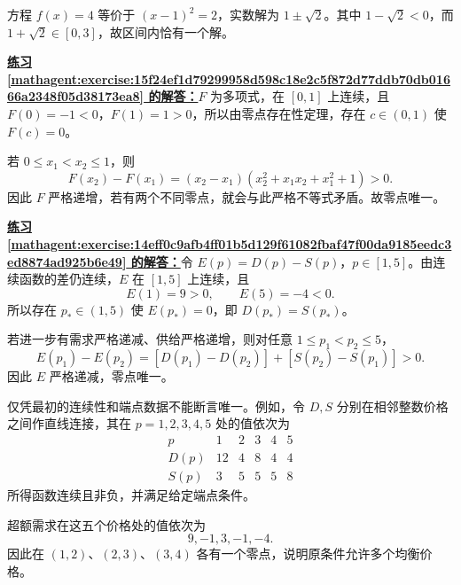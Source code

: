 \documentclass[UTF8,fontset=fandol,11pt]{ctexart}
\begin{document}
方程 $f(x)=4$ 等价于 $(x-1)^2=2$，实数解为 $1\pm\sqrt{2}$。其中 $1-\sqrt{2}<0$，而 $1+\sqrt{2}\in[0,3]$，故区间内恰有一个解。\par
\par\noindent\textbf{\hyperref[mathagent:exercise:15f24ef1d79299958d598c18e2c5f872d77ddb70db01666a2348f05d38173ea8]{练习 \ref*{mathagent:exercise:15f24ef1d79299958d598c18e2c5f872d77ddb70db01666a2348f05d38173ea8} 的解答：}}$F$ 为多项式，在 $[0,1]$ 上连续，且 $F(0)=-1<0$，$F(1)=1>0$，所以由零点存在性定理，存在 $c\in(0,1)$ 使 $F(c)=0$。

若 $0\leq x_1<x_2\leq1$，则
\[
F(x_2)-F(x_1)=(x_2-x_1)(x_2^2+x_1x_2+x_1^2+1)>0.
\]
因此 $F$ 严格递增，若有两个不同零点，就会与此严格不等式矛盾。故零点唯一。\par
\par\noindent\textbf{\hyperref[mathagent:exercise:14eff0c9afb4ff01b5d129f61082fbaf47f00da9185eedc3ed8874ad925b6e49]{练习 \ref*{mathagent:exercise:14eff0c9afb4ff01b5d129f61082fbaf47f00da9185eedc3ed8874ad925b6e49} 的解答：}}令 $E(p)=D(p)-S(p)$，$p\in[1,5]$。由连续函数的差仍连续，$E$ 在 $[1,5]$ 上连续，且
\[
E(1)=9>0,\qquad E(5)=-4<0.
\]
所以存在 $p_*\in(1,5)$ 使 $E(p_*)=0$，即 $D(p_*)=S(p_*)$。

若进一步有需求严格递减、供给严格递增，则对任意 $1\leq p_1<p_2\leq5$，
\[
E(p_1)-E(p_2)=[D(p_1)-D(p_2)]+[S(p_2)-S(p_1)]>0.
\]
因此 $E$ 严格递减，零点唯一。

仅凭最初的连续性和端点数据不能断言唯一。例如，令 $D,S$ 分别在相邻整数价格之间作直线连接，其在 $p=1,2,3,4,5$ 处的值依次为
\[
\begin{array}{c|ccccc}
p&1&2&3&4&5\\
D(p)&12&4&8&4&4\\
S(p)&3&5&5&5&8
\end{array}
\]
所得函数连续且非负，并满足给定端点条件。

超额需求在这五个价格处的值依次为
\[
9,-1,3,-1,-4.
\]
因此在 $(1,2)$、$(2,3)$、$(3,4)$ 各有一个零点，说明原条件允许多个均衡价格。\par
\end{document}
